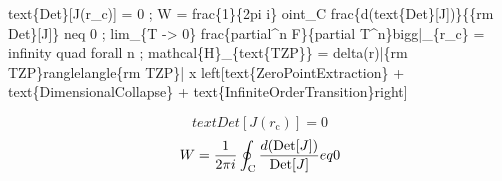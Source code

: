 
\begin{tzpsnapshot}
\end{tzpsnapshot}

text\{Det\}[J(r\_c)] = 0 ; W = frac\{1\}\{2pi i\} oint\_C frac\{d(text\{Det\}[J])\}\{\{rm Det\}[J]\} neq 0 ; lim\_\{T -> 0\} frac\{partial\textasciicircum{}n F\}\{partial T\textasciicircum{}n\}bigg|\_\{r\_c\} = infinity quad forall n ; mathcal\{H\}\_\{text\{TZP\}\} = delta(r)|\{rm TZP\}ranglelangle\{rm TZP\}| x left[text\{ZeroPointExtraction\} + text\{DimensionalCollapse\} + text\{InfiniteOrderTransition\}right]

\[
text{Det}[J(r_{\mathrm{c}})] = 0
\]
\[
W = \frac{1}{2\pi i} \oint_{\mathrm{C}} \frac{d(\text{Det}[J])}{{\rm Det}[J]}  eq 0
\]

